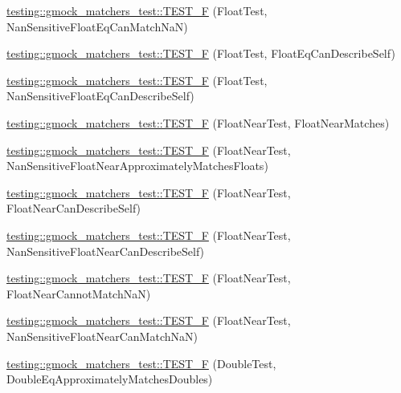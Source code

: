 \begin{DoxyCompactItemize}
\item 
\hyperlink{namespacetesting_1_1gmock__matchers__test_a4e9d89902e088a10915b4f9463ac0f09}{testing\+::gmock\+\_\+matchers\+\_\+test\+::\+T\+E\+S\+T\+\_\+F} (Float\+Test, Nan\+Sensitive\+Float\+Eq\+Can\+Match\+NaN)
\item 
\hyperlink{namespacetesting_1_1gmock__matchers__test_a264de01a5019e5c358116845bf5edd14}{testing\+::gmock\+\_\+matchers\+\_\+test\+::\+T\+E\+S\+T\+\_\+F} (Float\+Test, Float\+Eq\+Can\+Describe\+Self)
\item 
\hyperlink{namespacetesting_1_1gmock__matchers__test_a95a2bbc273ff70fc364c5c9c4697834c}{testing\+::gmock\+\_\+matchers\+\_\+test\+::\+T\+E\+S\+T\+\_\+F} (Float\+Test, Nan\+Sensitive\+Float\+Eq\+Can\+Describe\+Self)
\item 
\hyperlink{namespacetesting_1_1gmock__matchers__test_a6897409da5003f20f891d8a5ecabdc99}{testing\+::gmock\+\_\+matchers\+\_\+test\+::\+T\+E\+S\+T\+\_\+F} (Float\+Near\+Test, Float\+Near\+Matches)
\item 
\hyperlink{namespacetesting_1_1gmock__matchers__test_ad396e996ed685fd80cbd78740b8d01a8}{testing\+::gmock\+\_\+matchers\+\_\+test\+::\+T\+E\+S\+T\+\_\+F} (Float\+Near\+Test, Nan\+Sensitive\+Float\+Near\+Approximately\+Matches\+Floats)
\item 
\hyperlink{namespacetesting_1_1gmock__matchers__test_ad56232046efe7b4d5169a15fd15a2001}{testing\+::gmock\+\_\+matchers\+\_\+test\+::\+T\+E\+S\+T\+\_\+F} (Float\+Near\+Test, Float\+Near\+Can\+Describe\+Self)
\item 
\hyperlink{namespacetesting_1_1gmock__matchers__test_a4e90d53ea578d6b767559d8615a4c0c2}{testing\+::gmock\+\_\+matchers\+\_\+test\+::\+T\+E\+S\+T\+\_\+F} (Float\+Near\+Test, Nan\+Sensitive\+Float\+Near\+Can\+Describe\+Self)
\item 
\hyperlink{namespacetesting_1_1gmock__matchers__test_a2cd2ceebefa14a5d564a3bca60ed6572}{testing\+::gmock\+\_\+matchers\+\_\+test\+::\+T\+E\+S\+T\+\_\+F} (Float\+Near\+Test, Float\+Near\+Cannot\+Match\+NaN)
\item 
\hyperlink{namespacetesting_1_1gmock__matchers__test_ae7521865828fba53b45cc2819bec1273}{testing\+::gmock\+\_\+matchers\+\_\+test\+::\+T\+E\+S\+T\+\_\+F} (Float\+Near\+Test, Nan\+Sensitive\+Float\+Near\+Can\+Match\+NaN)
\item 
\hyperlink{namespacetesting_1_1gmock__matchers__test_a1b33dc485faca8c69184f3feb0476290}{testing\+::gmock\+\_\+matchers\+\_\+test\+::\+T\+E\+S\+T\+\_\+F} (Double\+Test, Double\+Eq\+Approximately\+Matches\+Doubles)
\item 

\end{DoxyCompactItemize}
